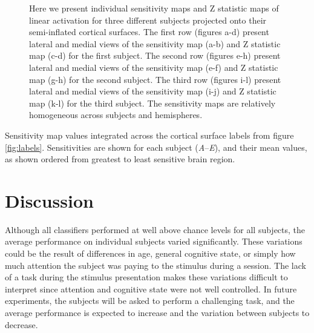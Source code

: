 \documentclass[5p,authoryear]{elsarticle}
\begin{document}
\begin{figure}
\begin{subfigure}{0.2\textwidth}
\caption{}
\label{fig:s3-lh-medial-zscore}
\end{subfigure}
\caption{Here we present individual sensitivity maps and Z statistic maps of linear activation for three different subjects projected onto their semi-inflated cortical surfaces.
 The first row (figures a-d) present lateral and medial views of the sensitivity map (a-b) and Z statistic map (c-d) for the first subject.
 The second row (figures e-h) present lateral and medial views of the sensitivity map (e-f) and Z statistic map (g-h) for the second subject.
 The third row (figures i-l) present lateral and medial views of the sensitivity map (i-j) and Z statistic map (k-l) for the third subject.
The sensitivity maps are relatively homogeneous across subjects and hemispheres.}
\label{fig:individual-sensitivity}
\end{figure}

\begin{table}
\centering

\caption{Sensitivity map values integrated across the cortical surface labels from figure \ref{fig:labels}. Sensitivities are shown for each subject (\emph{A}--\emph{E}), and their mean values, as shown ordered from greatest to least sensitive brain region.}
\label{tab:full-sensitivity}
\end{table}

\section{Discussion}
Although all classifiers performed at well above chance levels for all subjects, the average performance on individual subjects varied significantly.
These variations could be the result of differences in age, general cognitive state, or simply how much attention the subject was paying to the stimulus during a session.
The lack of a task during the stimulus presentation makes these variations difficult to interpret since attention and cognitive state were not well controlled.
In future experiments, the subjects will be asked to perform a challenging task, and the average performance is expected to increase and the variation between subjects to decrease.
\end{document}
